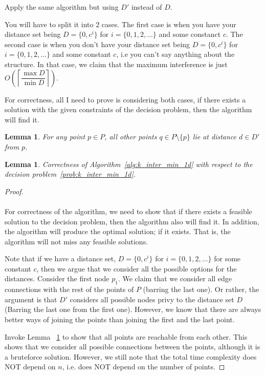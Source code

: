 \documentclass{article}
\newtheorem{lemma}[theorem]{Lemma}
\begin{document}
Apply the same algorithm but using $D'$ instead of $D$. 

You will have to split it into 2 cases. The first case is when you have your distance set being $D = \{0, c^i\}$ for $i = \{0, 1, 2, \dots \}$ and some constanct $c$. The second case is when you don't have your distance set being $D = \{0, c^i\}$ for $i = \{0, 1, 2, \dots \}$ and some constant $c$, i.e you can't say anything about the structure. In that case, we claim that the maximum interference is just $O\left(\left\lceil\dfrac{\max{D}}{\min{D}}\right\rceil\right)$.

For correctness, all I need to prove is considering both cases, if there exists a solution with the given constraints of the decision problem, then the algorithm will find it.

\begin{defintion}
	 
\end{defintion}

\begin{lemma}\label{lem:distance_set_reachable}
	For any point $p \in P$, all other points $q \in P\setminus \{p\}$ lie at distance $d \in D'$ from $p$.
\end{lemma}

\begin{lemma}
	Correctness of Algorithm~\ref{alg:k_inter_min_1d} with respect to the decision problem~\ref{prob:k_inter_min_1d}.
\end{lemma}
\begin{proof}
	$ $
	\\ \\
	For correctness of the algorithm, we need to show that if there exists a feasible solution to the decision problem, then the algorithm also will find it. In addition, the algorithm will produce the optimal solution; if it exists. That is, the algorithm will not miss any feasible solutions.

	Note that if we have a distance set, $D = \{0, c^i\}$ for $i = \{0, 1, 2, \dots \}$ for some constant $c$, then we argue that we consider all the possible options for the distances. Consider the first node $p_1$. We claim that we consider all edge connections with the rest of the points of $P$ (barring the last one). Or rather, the argument is that $D'$ considers all possible nodes privy to the distance set $D$ (Barring the last one from the first one). However, we know that there are always better ways of joining the points than joining the first and the last point.

	Invoke Lemma ~\ref{lem:distance_set_reachable} to show that all points are reachable from each other. This shows that we consider all possible connections between the points, although it is a bruteforce solution. However, we still note that the total time complexity does NOT depend on $n$, i.e. does NOT depend on the number of points.
\end{proof}
\end{document}
